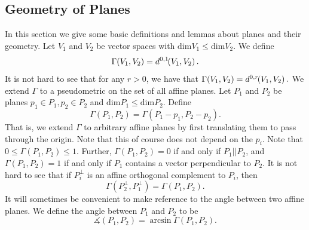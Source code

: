 \documentclass[11pt]{article}
\theoremstyle{definition}
\numberwithin{equation}{section}
\def\dim{\mathrm{dim}} \def\Hom{\mathrm{Hom}}
\newcommand{\Da}[3]{\twid{D}^{#1}\hspace{-3 pt}\left(#2,#3\right)}
\newcommand{\hd}[3]{d^{#1}\hspace{-3 pt}\left(#2,#3\right)}
\newcommand{\hda}[3]{\twid{d}^{#1}\hspace{-3 pt}\left(#2,#3\right)}
\newcommand{\sleq}{\leqslant}
\newcommand{\twid}[1]{\widetilde{#1}}
\newcommand{\meang}{\measuredangle}
\begin{document}

\subsection{Geometry of Planes}

In this section we give some basic definitions and lemmas about planes and their geometry. Let $V_1$ and $V_2$ be vector spaces with $\dim V_1\sleq \dim V_2$. We define
\begin{equation}
\Gamma(V_1, V_2) = \hd{0,1}{V_1}{ V_2}.
\end{equation}
It is not hard to see that for any $r>0$, we have that
$
\Gamma(V_1, V_2) = \hd{0,r}{V_1}{V_2}.
$
We extend $\Gamma$ to a pseudometric on the set of all affine planes. Let $P_1$ and $P_2$ be planes $p_1\in P_1, p_2\in P_2$ and $\dim P_1\sleq \dim P_2$. Define
\begin{equation}
\Gamma(P_1, P_2) = \Gamma(P_1-p_1, P_2-p_2).
\end{equation}
That is, we extend $\Gamma$ to arbitrary affine planes by first translating them to pass through the origin. Note that this of course does not depend on the $p_i$. Note that $0\sleq \Gamma(P_1, P_2)\sleq 1$. Further, $\Gamma(P_1, P_2) = 0$ if and only if $P_1 || P_2$, and $\Gamma(P_1, P_2) = 1$ if and only if $P_1$ contains a vector perpendicular to $P_2$. It is not hard to see that if $P_i^\perp$ is an affine orthogonal complement to $P_i$, then
\begin{equation}\label{normals}
\Gamma(P_2^\perp, P_1^\perp) = \Gamma(P_1, P_2).
\end{equation}
It will sometimes be convenient to make reference to the angle between two affine planes. We define the angle between $P_1$ and $P_2$ to be
\begin{equation}
\meang(P_1, P_2) = \arcsin\Gamma(P_1, P_2).
\end{equation}
\end{document}
